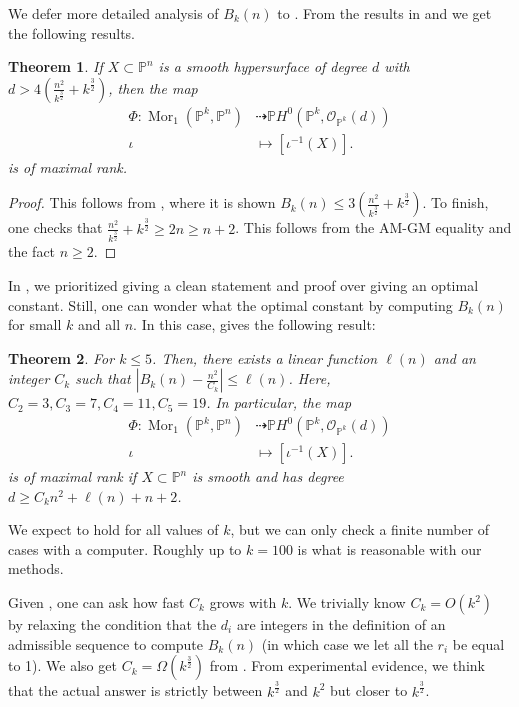 \documentclass[11pt,reqno]{amsart}
\theoremstyle{plain}
\newtheorem{theorem}{Theorem}[section]
\theoremstyle{definition}
\theoremstyle{remark}
\numberwithin{equation}{section}
\numberwithin{equation}{section}
\newcommand{\OO}{\mathscr{O}}
\newcommand{\PP}{\mathbb{P}}
\begin{document}
We defer more detailed analysis of $B_k(n)$ to . From the results in  and  we get the following results.

\begin{theorem}
\label{thm:knboundslice}
If $X\subset\PP^n$ is a smooth hypersurface of degree $d$ with $d>4(\frac{n^2}{k^{\frac{3}{2}}}+k^{\frac{3}{2}})$, then the map \begin{align*}
    \Phi: \operatorname{Mor}_1(\PP^k,\PP^n)&\dashrightarrow \PP H^0(\PP^k,\OO_{\PP^k}(d))\\
    \iota &\mapsto [\iota^{-1}(X)].
\end{align*}
is of maximal rank.
\end{theorem}
\begin{proof}
This follows from , where it is shown $B_k(n) \leq 3 \left(\frac{n^2}{k^{\frac{3}{2}}}+k^{\frac{3}{2}} \right)$. To finish, one checks that $\frac{n^2}{k^{\frac{3}{2}}}+k^{\frac{3}{2}}\geq 2n\geq n+2$. This follows from the AM-GM equality and the fact $n\geq 2$.
\end{proof}

In , we prioritized giving a clean statement and proof over giving an optimal constant. Still, one can wonder what the optimal constant by computing $B_k(n)$ for small $k$ and all $n$. In this case,  gives the following result:
\begin{theorem}
\label{thm:smallkslice}
For $k\leq 5$. Then, there exists a linear function $\ell(n)$ and an integer $C_k$ such that $|B_k(n)-\frac{ n^2}{C_k}|\leq \ell(n)$. Here, $C_2=3,C_3=7,C_4=11,C_5=19$. In particular, the map
\begin{align*}
    \Phi: \operatorname{Mor}_1(\PP^k,\PP^n)&\dashrightarrow \PP H^0(\PP^k,\OO_{\PP^k}(d))\\
    \iota &\mapsto [\iota^{-1}(X)].
\end{align*}
is of maximal rank if $X\subset \PP^n$ is smooth and has degree $d\geq C_k n^2+\ell(n)+n+2$.
\end{theorem}

We expect  to hold for all values of $k$, but we can only check a finite number of cases with a computer. Roughly up to $k=100$ is what is reasonable with our methods.

Given , one can ask how fast $C_k$ grows with $k$. We trivially know $C_k=O(k^2)$ by relaxing the condition that the $d_i$ are integers in the definition of an admissible sequence to compute $B_k(n)$ (in which case we let all the $r_i$ be equal to 1). We also get $C_k=\Omega(k^{\frac{3}{2}})$ from . From experimental evidence, we think that the actual answer is strictly between $k^{\frac{3}{2}}$ and $k^{2}$ but closer to $k^{\frac{3}{2}}$.
\appendix
\end{document}

